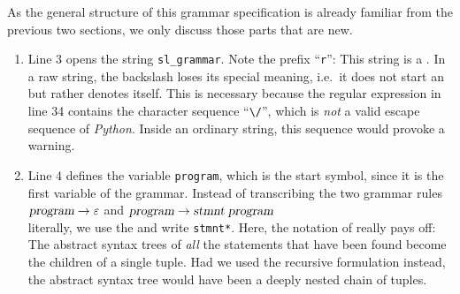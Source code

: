 \noindent
As the general structure of this grammar specification is already familiar from the previous two sections,
we only discuss those parts that are new.
\begin{enumerate}
\item Line 3 opens the string \texttt{sl\_grammar}.  Note the prefix ``\texttt{r}'':  This string is a
      .  In a raw string, the backslash loses its special meaning, i.e.~it does not start
      an  but rather denotes itself.  This is necessary because the regular
      expression in line 34 contains the character sequence ``\verb$\/$'', %
      which is \emph{not} a valid
      escape sequence of \textsl{Python}.  Inside an ordinary string, this sequence would provoke a
      warning.
\item Line 4 defines the variable \texttt{program}, which is the start symbol, since it is the first variable
      of the grammar.  Instead of transcribing the two grammar rules
      \\[0.2cm]
      \hspace*{1.3cm}
      $\textsl{program} \rightarrow \varepsilon$
      \quad and \quad
      $\textsl{program} \rightarrow \textsl{stmnt}\;\textsl{program}$
      \\[0.2cm]
      literally, we use the  and write \texttt{stmnt*}.  Here, the
       notation of  really pays off:  The abstract syntax trees of
      \emph{all} the statements that have been found become the children of a single tuple.  Had we used the
      recursive formulation instead, the abstract syntax tree would have been a deeply nested chain of tuples.


\end{enumerate}
